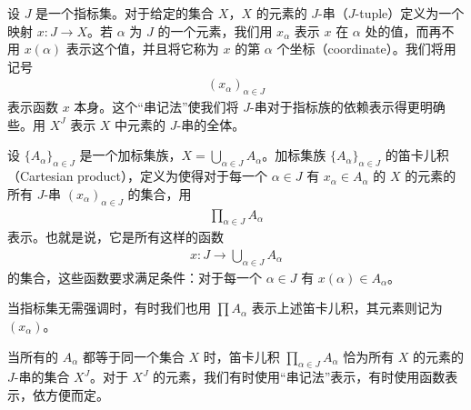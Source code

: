 \documentclass[../../main.tex]{subfiles}
\begin{document}
\begin{definition}[$J$-串与笛卡儿积]\label{definition:ch02-J串}
设 $J$ 是一个指标集。对于给定的集合 $X$，$X$ 的元素的 $J$-串（$J$-tuple）定义为一个映射 $x: J \rightarrow X$。若 $\alpha$ 为 $J$ 的一个元素，我们用 $x_{\alpha}$ 表示 $x$ 在 $\alpha$ 处的值，而再不用 $x(\alpha)$ 表示这个值，并且将它称为 $x$ 的第 $\alpha$ 个坐标（coordinate）。我们将用记号
\begin{align*}
(x_{\alpha})_{\alpha \in J}
\end{align*}
表示函数 $x$ 本身。这个“串记法”使我们将 $J$-串对于指标族的依赖表示得更明确些。用 $X^{J}$ 表示 $X$ 中元素的 $J$-串的全体。

设 $\{A_{\alpha}\}_{\alpha \in J}$ 是一个加标集族，$X = \bigcup_{\alpha \in J} A_{\alpha}$。加标集族 $\{A_{\alpha}\}_{\alpha \in J}$ 的笛卡儿积（Cartesian product），定义为使得对于每一个 $\alpha \in J$ 有 $x_{\alpha} \in A_{\alpha}$ 的 $X$ 的元素的所有 $J$-串 $(x_{\alpha})_{\alpha \in J}$ 的集合，用
\begin{align*}
\prod_{\alpha \in J} A_{\alpha}
\end{align*}
表示。也就是说，它是所有这样的函数
\begin{align*}
x: J \longrightarrow \bigcup_{\alpha \in J} A_{\alpha}
\end{align*}
的集合，这些函数要求满足条件：对于每一个 $\alpha \in J$ 有 $x(\alpha) \in A_{\alpha}$。

当指标集无需强调时，有时我们也用 $\prod A_{\alpha}$ 表示上述笛卡儿积，其元素则记为 $(x_{\alpha})$。

当所有的 $A_{\alpha}$ 都等于同一个集合 $X$ 时，笛卡儿积 $\prod_{\alpha \in J} A_{\alpha}$ 恰为所有 $X$ 的元素的 $J$-串的集合 $X^{J}$。对于 $X^{J}$ 的元素，我们有时使用“串记法”表示，有时使用函数表示，依方便而定。
\end{definition}
\end{document}
